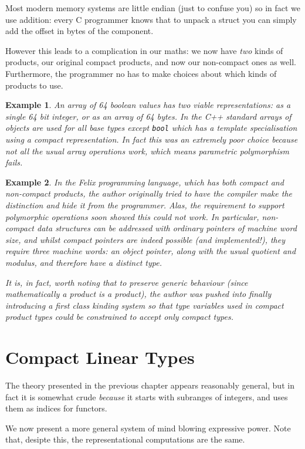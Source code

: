 \documentclass[oneside]{book}
\theoremstyle{plain}
\newtheorem{example}{Example}
\theoremstyle{definition}
\theoremstyle{plain}
\begin{document}
Most modern memory systems are little endian (just to confuse you)
so in fact we use addition: every C programmer knows that to unpack
a struct you can simply add the offset in bytes of the component.

However this leads to a complication in our maths: we now have
{\em two} kinds of products, our original compact products,
and now our non-compact ones as well. Furthermore, the programmer
no has to make choices about which kinds of products to use.

\begin{example}
An array of 64 boolean values has two viable representations:
as a single 64 bit integer, or as an array of 64 bytes. In the C++
standard arrays of objects are used for all base types except 
\verb$bool$ which has a template specialisation using a compact
representation. In fact this was an extremely poor choice because
not all the usual array operations work, which means parametric
polymorphism fails.
\end{example}

\begin{example}
In the Felix programming language, which has both compact and non-compact
products, the author originally tried to have the compiler make
the distinction and hide it from the programmer. Alas, the requirement
to support polymorphic operations soon showed this could not work.
In particular, non-compact data structures can be addressed with
ordinary pointers of machine word size, and whilst compact
pointers are indeed possible (and implemented!), they require
three machine words: an object pointer, along with the usual
quotient and modulus, and therefore have a distinct type.

It is, in fact, worth noting that to preserve generic behaviour
(since mathematically a product is a product), the author was
pushed into finally introducing a first class kinding system
so that type variables used in compact product types could
be constrained to accept only compact types.
\end{example}

\chapter{Compact Linear Types}
The theory presented in the previous chapter appears reasonably general,
but in fact it is somewhat crude {\em because} it starts with subranges
of integers, and uses them as indices for functors.

We now present a more general system of mind blowing expressive power.
Note that, desipte this, the representational computations are the same.
\end{document}

